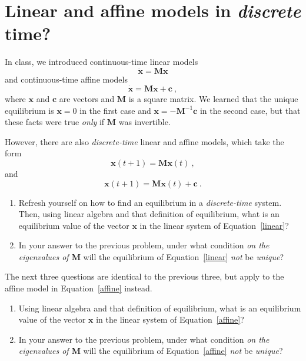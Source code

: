 \documentclass[11pt,onecolumn,superscriptaddress,notitlepage]{article}
\newcommand{\vx}[0]{\mathbf{x}}
\begin{document}
\clearpage
\section*{Linear and affine models in {\it discrete} time?} 
In class, we introduced continuous-time linear models 
$$\dot{\vx} = \mathbf{M}\vx$$
 and continuous-time affine models 
$$\dot{\vx} = \mathbf{M}\vx + \mathbf{c}\ ,$$
 where $\vx$ and $\mathbf{c}$ are vectors and $\mathbf{M}$ is a square matrix. We learned that the unique equilibrium is $\vx=0$ in the first case and $\vx=-\mathbf{M}^{-1} \mathbf{c}$ in the second case, but that these facts were true {\it only} if $\mathbf{M}$ was invertible. 
 
 
 However, there are also {\it discrete-time} linear and affine models, which take the form
 \begin{equation}
	 \vx(t+1) = \mathbf{M} \vx(t)\ ,
	 \label{linear}
 \end{equation}
and 
\begin{equation}
	\vx(t+1) = \mathbf{M} \vx(t) + \mathbf{c}\ .
	\label{affine}
\end{equation}

\vspace{0.2in}
\begin{enumerate}[resume]
	\item Refresh yourself on how to find an equilibrium in a {\it discrete-time} system. Then, using linear algebra and that definition of equilibrium, what is an equilibrium value of the vector $\mathbf{x}$ in the linear system of Equation~\eqref{linear}?
	\item In your answer to the previous problem, under what condition {\it on the eigenvalues of $\mathbf{M}$} will the equilibrium of Equation~\eqref{linear} {\it not} be {\it unique}?
\end{enumerate}

\vspace{0.2in}
The next three questions are identical to the previous three, but apply to the affine model in Equation~\eqref{affine} instead. 
\begin{enumerate}[resume]
	\item Using linear algebra and that definition of equilibrium, what is an equilibrium value of the vector $\mathbf{x}$ in the linear system of Equation~\eqref{affine}?
	\item In your answer to the previous problem, under what condition {\it on the eigenvalues of $\mathbf{M}$} will the equilibrium of Equation~\eqref{affine} {\it not} be {\it unique}?
\end{enumerate}
\end{document}
